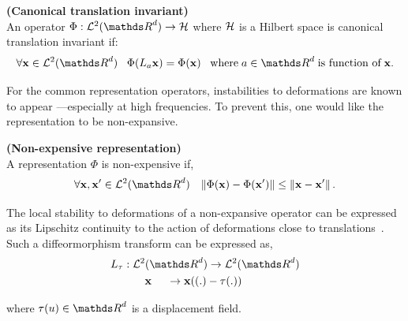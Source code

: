 \documentclass[a4paper,11pt]{report}
\begin{document}
      \begin{defn} \textbf{(Canonical translation invariant)}\\ 
				An operator $\Phi: \mcalL^{2}(\dsR^{d}) \rightarrow \mcalH$ where $\mathcal{H}$ is a Hilbert space is canonical translation invariant if:
        \begin{equation*}
			  		\forall \bfx \in \mcalL^{2}(\dsR^{d}) \;\;\;
			  		\Phi(L_{a}\bfx) = \Phi(\bfx) 
			  		\;\;\; \text{where} \; a \in \dsR^{d} \; \text{is function of} \; \bfx.
				\end{equation*}
				\label{def:Canonical translation invariance - intuition}
      \end{defn}
      
      For the common representation operators, instabilities to deformations are known to appear ---especially at high frequencies. To prevent this, one would like the representation to be non-expansive.
      
      \begin{defn} \textbf{(Non-expensive representation)}\\
				A representation $\Phi$ is non-expensive if,
				\begin{equation}
			  		\forall \bfx,\bfx' \in \mcalL^{2}(\dsR^{d}) \;\;\; 
			  		\norm{\Phi(\bfx) - \Phi(\bfx')} \leq \norm{\bfx-\bfx'}.
				\end{equation}
				\label{def:Non-expansivity - intuition}
      \end{defn}
      
      The local stability to deformations of a non-expansive operator can be expressed as its Lipschitz continuity to the action of deformations close to translations~\citep{mallat2012gis}. Such a diffeormorphism transform can be expressed as,
      \begin{equation*}
      		\begin{split}
      			L_{\tau}	: \; & \mcalL^{2}(\dsR^{d}) \rightarrow \mcalL^{2}(\dsR^{d})\\
      							  & \;\;\;\; \bfx \;\;\;\;\; \rightarrow  \bfx((.) - \tau(.))
				\end{split}
      \end{equation*}

			where $\tau(u) \in \dsR^{d}$ is a displacement field.
			
\end{document}
